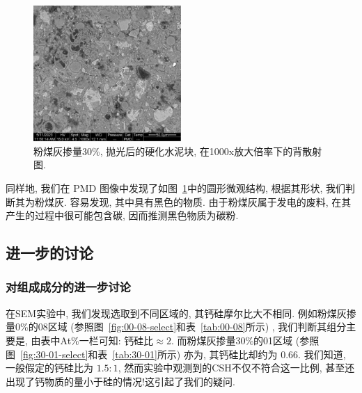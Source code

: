 \begin{figure}[!t]
  \centering
  \includegraphics[width = 0.5\textwidth]{assets/30-polished-01000x-PMD.png}
  \caption{粉煤灰掺量30\%, 抛光后的硬化水泥块, 在1000x放大倍率下的背散射图. }
  \label{fig:BSE-FA}
\end{figure}

同样地, 我们在 PMD 图像中发现了如图~\ref{fig:BSE-FA}中的圆形微观结构, 根据其形状, 我们判断其为粉煤灰. 容易发现, 其中具有黑色的物质. 由于粉煤灰属于发电的废料, 在其产生的过程中很可能包含碳, 因而推测黑色物质为碳粉.

\subsection{进一步的讨论}

\subsubsection{对组成成分的进一步讨论}

在SEM实验中, 我们发现选取到不同区域的, 其钙硅摩尔比大不相同. 例如粉煤灰掺量0\%的08区域 (参照图~\ref{fig:00-08-select}和表~\ref{tab:00-08}所示) , 我们判断其组分主要是, 由表中At\%一栏可知: $\text{钙硅比}\approx 2$. 而粉煤灰掺量30\%的01区域 (参照图~\ref{fig:30-01-select}和表~\ref{tab:30-01}所示) 亦为, 其钙硅比却约为 \num{0.66}. 我们知道, 一般假定的钙硅比为 $1.5:1$, 然而实验中观测到的CSH不仅不符合这一比例, 甚至还出现了钙物质的量小于硅的情况!这引起了我们的疑问. 

